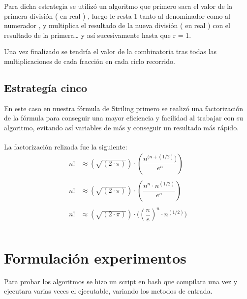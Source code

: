 \documentclass[12pt,letterpaper]{scrartcl}
\begin{document}
Para dicha estrategia se utilizó un algoritmo que primero saca el valor de la primera división ( en real ) , luego le resta 1 tanto al denominador como al numerador , y multiplica el resultado de la nueva división ( en real ) con el resultado de la primera… y así sucesivamente hasta que r = 1.

Una vez finalizado se tendría el valor de la combinatoria tras todas las multiplicaciones de cada fracción en cada ciclo recorrido.

\subsection{Estrategía cinco}

En este caso en nuestra fórmula de Striling primero se realizó una factorización de la fórmula para conseguir una mayor eficiencia y facilidad al trabajar con su algoritmo, evitando así
variables de más y conseguir un resultado más rápido.\\\\
La factorización relizada fue la siguiente:
\\
\[\begin{matrix}

{n!} &\approx {( \sqrt{(2 \cdot \pi)} )}\cdot{(\dfrac{n^{(n+(1/2)})}{e^n})}\\

&\\

{n!} &\approx {( \sqrt{(2 \cdot \pi)} )}\cdot{( \dfrac{ n^n \cdot n^{(1/2)} }{ e^n })}\\

&\\

{n!} &\approx {( \sqrt{(2 \cdot \pi)} )}\cdot{( ( \dfrac{ n }{ e } )^n }\cdot{ n^{(1/2)} )}\\

&\\

\end{matrix}
\]

\newpage
\section{Formulación experimentos}

Para probar los algoritmos se hizo un script en bash que compilara una vez y ejecutara varias veces el ejecutable, variando los metodos de entrada. 
\\\\
\end{document}
